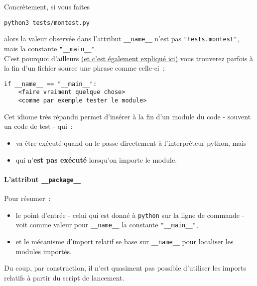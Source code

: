 Concrètement, si vous faites

\begin{verbatim}
python3 tests/montest.py
\end{verbatim}

alors la valeur observée dans l'attribut \texttt{\_\_name\_\_} n'est pas
\texttt{"tests.montest"}, mais la constante \texttt{"\_\_main\_\_"}.\\

    C'est pourquoi d'ailleurs
\href{https://docs.python.org/3/tutorial/modules.html\#executing-modules-as-scripts}{(et
c'est également expliqué ici)} vous trouverez parfois à la fin d'un
fichier source une phrase comme celle-ci~:

    \begin{verbatim}
if __name__ == "__main__":
    <faire vraiment quelque chose>
    <comme par exemple tester le module>
\end{verbatim}

    Cet idiome très répandu permet d'insérer à la fin d'un module du code -
souvent un code de test - qui~:

\begin{itemize}
	\item 
	va être exécuté quand on le passe
	directement à l'interpréteur python, mais
	\item
	qui n'\textbf{est pas
	exécuté} lorsqu'on importe le module.
\end{itemize}

    \hypertarget{lattribut-__package__}{%
\paragraph{\texorpdfstring{L'attribut
\texttt{\_\_package\_\_}}{L'attribut \_\_package\_\_}}\label{lattribut-__package__}}

    Pour résumer~:

\begin{itemize}
\tightlist
\item
  le point d'entrée - celui qui est donné à \texttt{python} sur la ligne
  de commande - voit comme valeur pour \texttt{\_\_name\_\_} la
  constante \texttt{"\_\_main\_\_"},\\
\item
  et le mécanisme d'import relatif se base sur \texttt{\_\_name\_\_}
  pour localiser les modules importés.
\end{itemize}

    Du coup, par construction, il n'est quasiment pas possible d'utiliser
les imports relatifs à partir du script de lancement.\\

